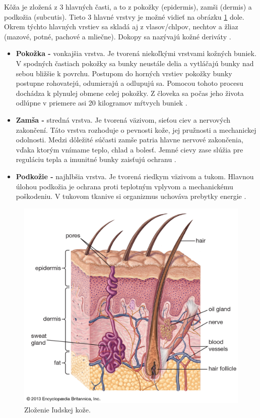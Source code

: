 Kôža je zložená z 3 hlavných časti, a to z pokožky (epidermis), zamši (dermis) a podkožia (subcutis). Tieto 3 hlavné vrstvy je možné vidieť na obrázku \ref{fig:koza} dole. Okrem týchto hlavných vrstiev sa skladá aj z vlasov/chlpov, nechtov a žliaz (mazové, potné, pachové a mliečne). Dokopy sa nazývajú kožné deriváty \cite{Pokorna2012}. 
\begin{itemize}  
\item \textbf{Pokožka -} vonkajšia vrstva. Je tvorená niekoľkými vrstvami kožných buniek. V spodných častiach pokožky sa bunky neustále delia a vytláčajú bunky nad sebou bližšie k povrchu. Postupom do horných vrstiev pokožky bunky postupne rohovatejú, odumierajú a odlupujú sa. Pomocou tohoto procesu dochádza k plynulej obmene celej pokožky. Z človeka sa počas jeho života odlúpne v priemere asi 20 kilogramov mŕtvych buniek \cite{pcCdSrbbhhlr5YcQ}. 
\item \textbf{Zamša -} stredná vrstva. Je tvorená väzivom, sieťou ciev a nervových zakončení. Táto vrstva rozhoduje o pevnosti kože, jej pružnosti a mechanickej odolnosti. Medzi dôležité súčasti zamše patria hlavne nervové zakončenia, vďaka ktorým vnímame teplo, chlad a bolesť. Jemné cievy zase slúžia pre reguláciu tepla a imunitné bunky zaisťujú ochranu \cite{pcCdSrbbhhlr5YcQ}.
\item \textbf{Podkožie -} najhlbšia vrstva. Je tvorená riedkym väzivom a tukom. Hlavnou úlohou podkožia je ochrana proti teplotným vplyvom a mechanickému poškodeniu. V tukovom tkanive si organizmus uchováva prebytky energie \cite{pcCdSrbbhhlr5YcQ, Hlinkova2015}. 
\end{itemize}
\begin{figure}[h]
  \centering
  \includegraphics[scale=0.19]{fig/koza.jpg}
  \caption{Zloženie ľudskej kože. \cite{Ebling2016}}
  \label{fig:koza}
\end{figure}


